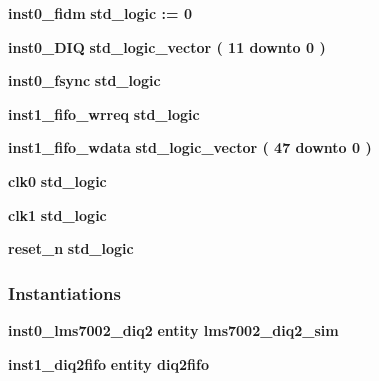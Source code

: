 \begin{DoxyCompactItemize}
\item 
{\bf inst0\+\_\+fidm} {\bfseries \textcolor{comment}{std\+\_\+logic}\textcolor{vhdlchar}{ }\textcolor{vhdlchar}{ }\textcolor{vhdlchar}{\+:}\textcolor{vhdlchar}{=}\textcolor{vhdlchar}{ }\textcolor{vhdlchar}{ }\textcolor{vhdlchar}{\textquotesingle{}}\textcolor{vhdlchar}{ } \textcolor{vhdldigit}{0} \textcolor{vhdlchar}{ }\textcolor{vhdlchar}{\textquotesingle{}}\textcolor{vhdlchar}{ }} 
\item 
{\bf inst0\+\_\+\+D\+IQ} {\bfseries \textcolor{comment}{std\+\_\+logic\+\_\+vector}\textcolor{vhdlchar}{ }\textcolor{vhdlchar}{(}\textcolor{vhdlchar}{ }\textcolor{vhdlchar}{ } \textcolor{vhdldigit}{11} \textcolor{vhdlchar}{ }\textcolor{keywordflow}{downto}\textcolor{vhdlchar}{ }\textcolor{vhdlchar}{ } \textcolor{vhdldigit}{0} \textcolor{vhdlchar}{ }\textcolor{vhdlchar}{)}\textcolor{vhdlchar}{ }} 
\item 
{\bf inst0\+\_\+fsync} {\bfseries \textcolor{comment}{std\+\_\+logic}\textcolor{vhdlchar}{ }} 
\item 
{\bf inst1\+\_\+fifo\+\_\+wrreq} {\bfseries \textcolor{comment}{std\+\_\+logic}\textcolor{vhdlchar}{ }} 
\item 
{\bf inst1\+\_\+fifo\+\_\+wdata} {\bfseries \textcolor{comment}{std\+\_\+logic\+\_\+vector}\textcolor{vhdlchar}{ }\textcolor{vhdlchar}{(}\textcolor{vhdlchar}{ }\textcolor{vhdlchar}{ } \textcolor{vhdldigit}{47} \textcolor{vhdlchar}{ }\textcolor{keywordflow}{downto}\textcolor{vhdlchar}{ }\textcolor{vhdlchar}{ } \textcolor{vhdldigit}{0} \textcolor{vhdlchar}{ }\textcolor{vhdlchar}{)}\textcolor{vhdlchar}{ }} 
\item 
{\bf clk0} {\bfseries \textcolor{comment}{std\+\_\+logic}\textcolor{vhdlchar}{ }} 
\item 
{\bf clk1} {\bfseries \textcolor{comment}{std\+\_\+logic}\textcolor{vhdlchar}{ }} 
\item 
{\bf reset\+\_\+n} {\bfseries \textcolor{comment}{std\+\_\+logic}\textcolor{vhdlchar}{ }} 
\end{DoxyCompactItemize}
\subsubsection*{Instantiations}
 \begin{DoxyCompactItemize}
\item 
{\bf inst0\+\_\+lms7002\+\_\+diq2}  {\bfseries entity lms7002\+\_\+diq2\+\_\+sim}   
\item 
{\bf inst1\+\_\+diq2fifo}  {\bfseries entity diq2fifo}   
\end{DoxyCompactItemize}


